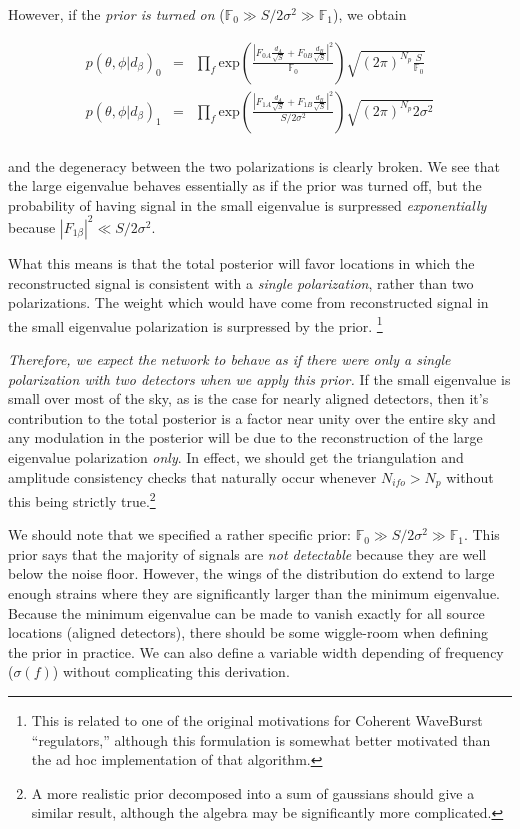 \documentclass[10pt]{article}
\begin{document}
However, if the \emph{prior is turned on} ($\mathbb{F}_0 \gg S/2\sigma^2 \gg \mathbb{F}_1$), we obtain

\begin{eqnarray}
p(\theta,\phi|d_\beta)_0 & = & \prod\limits_f \mathrm{exp}\left( \frac{\left|F_{0A} \frac{d_A}{\sqrt{S}} + F_{0B} \frac{d_B}{\sqrt{S}}\right|^2}{\mathbb{F}_0} \right) \sqrt{(2\pi)^{N_p} \frac{S}{\mathbb{F}_0}} \\
p(\theta,\phi|d_\beta)_1 & = & \prod\limits_f \mathrm{exp}\left( \frac{\left|F_{1A} \frac{d_A}{\sqrt{S}} + F_{1B} \frac{d_B}{\sqrt{S}}\right|^2}{S/2\sigma^2} \right) \sqrt{(2\pi)^{N_p} 2\sigma^2} \\
\end{eqnarray}

and the degeneracy between the two polarizations is clearly broken. We see that the large eigenvalue behaves essentially as if the prior was turned off, but the probability of having signal in the small eigenvalue is surpressed \emph{exponentially} because $|F_{1\beta}|^2 \ll S/2\sigma^2$.

What this means is that the total posterior will favor locations in which the reconstructed signal is consistent with a \emph{single polarization}, rather than two polarizations. The weight which would have come from reconstructed signal in the small eigenvalue polarization is surpressed by the prior. \footnote{This is related to one of the original motivations for Coherent WaveBurst ``regulators,'' although this formulation is somewhat better motivated than the ad hoc implementation of that algorithm.} 

\emph{Therefore, we expect the network to behave as if there were only a single polarization with two detectors when we apply this prior.} If the small eigenvalue is small over most of the sky, as is the case for nearly aligned detectors, then it's contribution to the total posterior is a factor near unity over the entire sky and any modulation in the posterior will be due to the reconstruction of the large eigenvalue polarization \emph{only}. In effect, we should get the triangulation and amplitude consistency checks that naturally occur whenever $N_{ifo} > N_p$ without this being strictly true.\footnote{A more realistic prior decomposed into a sum of gaussians should give a similar result, although the algebra may be significantly more complicated.}

We should note that we specified a rather specific prior: $\mathbb{F}_0 \gg S/2\sigma^2 \gg \mathbb{F}_1$. This prior says that the majority of signals are \emph{not detectable} because they are well below the noise floor. However, the wings of the distribution do extend to large enough strains where they are significantly larger than the minimum eigenvalue. Because the minimum eigenvalue can be made to vanish exactly for all source locations (aligned detectors), there should be some wiggle-room when defining the prior in practice. We can also define a variable width depending of frequency ($\sigma(f)$) without complicating this derivation. 
\end{document}

